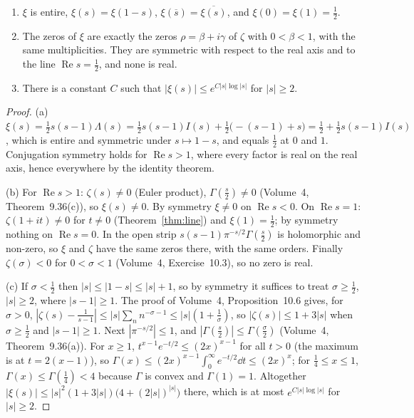 \begin{proposition}\label{prop:xi}
\begin{enumerate}[label=(\alph*)]
\item $\xi$ is entire, $\xi(s)=\xi(1-s)$, $\xi(\overline s)=\overline{\xi(s)}$, and $\xi(0)=\xi(1)=\frac12$.
\item The zeros of $\xi$ are exactly the zeros $\rho=\beta+i\gamma$ of $\zeta$ with $0<\beta<1$, with the same multiplicities. They are symmetric with respect to the real axis and to
the line $\operatorname{Re}s=\frac12$, and none is real.
\item There is a constant $C$ such that $|\xi(s)|\le e^{C|s|\log|s|}$ for $|s|\ge2$.
\end{enumerate}
\end{proposition}
\begin{proof}
(a) $\xi(s)=\frac12s(s-1)\Lambda(s)=\frac12s(s-1)I(s)+\frac12\bigl(-(s-1)+s\bigr)=\frac12+\frac12s(s-1)I(s)$, which is entire and symmetric under $s\mapsto1-s$, and equals $\frac12$ at $0$ and $1$.
Conjugation symmetry holds for $\operatorname{Re}s>1$, where every factor is real on the real axis, hence everywhere by the identity theorem.

(b) For $\operatorname{Re}s>1$: $\zeta(s)\ne0$ (Euler product), $\Gamma(\frac s2)\ne0$ (Volume~4, Theorem~9.36(c)), so $\xi(s)\ne0$. By symmetry $\xi\ne0$ on $\operatorname{Re}s<0$. On $\operatorname{Re}s=1$:
$\zeta(1+it)\ne0$ for $t\ne0$ (Theorem~\ref{thm:line}) and $\xi(1)=\frac12$; by symmetry nothing on $\operatorname{Re}s=0$. In the open strip $s(s-1)\pi^{-s/2}\Gamma(\frac s2)$ is holomorphic
and non-zero, so $\xi$ and $\zeta$ have the same zeros there, with the same orders. Finally $\zeta(\sigma)<0$ for $0<\sigma<1$ (Volume~4, Exercise~10.3), so no zero is real.

(c) If $\sigma<\frac12$ then $|s|\le|1-s|\le|s|+1$, so by symmetry it suffices to treat $\sigma\ge\frac12$, $|s|\ge2$, where $|s-1|\ge1$. The proof of Volume~4, Proposition~10.6 gives, for $\sigma>0$,
$|\zeta(s)-\frac1{s-1}|\le|s|\sum_nn^{-\sigma-1}\le|s|(1+\frac1\sigma)$, so $|\zeta(s)|\le1+3|s|$ when $\sigma\ge\frac12$ and $|s-1|\ge1$. Next $|\pi^{-s/2}|\le1$, and
$|\Gamma(\frac s2)|\le\Gamma(\frac\sigma2)$ (Volume~4, Theorem~9.36(a)). For $x\ge1$, $t^{x-1}e^{-t/2}\le(2x)^{x-1}$ for all $t>0$ (the maximum is at $t=2(x-1)$), so $\Gamma(x)\le(2x)^{x-1}\int_0^\infty e^{-t/2}\dd t\le(2x)^x$; for
$\frac14\le x\le1$, $\Gamma(x)\le\Gamma(\frac14)<4$ because $\Gamma$ is convex and $\Gamma(1)=1$. Altogether $|\xi(s)|\le|s|^2(1+3|s|)\bigl(4+(2|s|)^{|s|}\bigr)$ there, which is
at most $e^{C|s|\log|s|}$ for $|s|\ge2$.
\end{proof}

